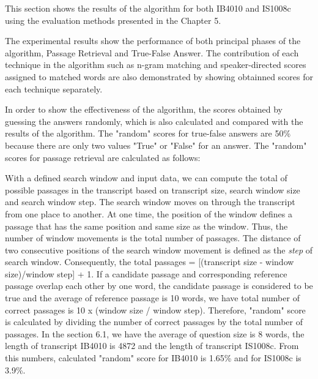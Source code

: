 This section shows the results of the algorithm for both IB4010 and IS1008c using the evaluation methods presented in the Chapter 5.

The experimental results show the performance of both principal phases of the algorithm, Passage Retrieval and True-False Answer. The contribution of each technique in the algorithm such as n-gram matching and speaker-directed scores assigned to matched words are also demonstrated by showing obtainned scores for each technique separately. 

In order to show the effectiveness of the algorithm, the scores obtained by guessing the answers randomly, which is also calculated and compared with the results of the algorithm. The "random" scores for true-false answers are 50\% because there are only two values "True" or "False" for an answer. The "random" scores for passage retrieval are calculated as follows:

With a defined search window and input data, we can compute the total of possible passages in the transcript based on transcript size, search window size and search window step. The search window moves on through the transcript from one place to another. At one time, the position of the window defines a passage that has the same position and same size as the window. Thus, the number of window movements is the total number of passages. The distance of two consecutive positions of the search window movement is defined as the \textit{step} of search window. Consequently, the total passages = [(transcript size - window size)/window step] + 1.  If a candidate passage and corresponding reference passage overlap each other by one word, the candidate passage is considered to be true and the average of reference passage is 10 words, we have total number of correct passages is 10 x (window size / window step). Therefore, "random" score is calculated by dividing the number of correct passages by the total number of passages. In the section 6.1, we have the average of question size is 8 words, the length of transcript IB4010 is 4872 and the length of transcript IS1008c. From this numbers, calculated "random" score for IB4010 is 1.65\% and for IS1008c is 3.9\%.

%
%
%


